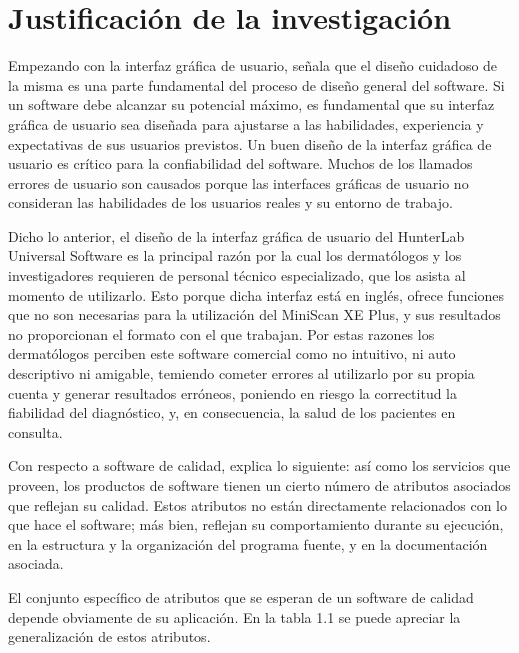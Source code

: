 	\section{Justificaci\'{o}n de la investigaci\'{o}n}
	
	Empezando con la interfaz gr\'{a}fica de usuario, \cite{Sommerville} se\~{n}ala que el dise\~{n}o cuidadoso de la misma es una parte fundamental del proceso de dise\~{n}o general del software. Si un software debe alcanzar su potencial m\'{a}ximo, es fundamental que su interfaz gr\'{a}fica de usuario sea dise\~{n}ada para ajustarse a las habilidades, experiencia y expectativas de sus usuarios previstos. Un buen dise\~{n}o de la interfaz gr\'{a}fica de usuario es cr\'{i}tico para la confiabilidad del software. Muchos de los llamados errores de usuario son causados porque las interfaces gr\'{a}ficas de usuario no consideran las habilidades de los usuarios reales y su entorno de trabajo.

	Dicho lo anterior, el dise\~{n}o de la interfaz gr\'{a}fica de usuario del HunterLab Universal Software es la principal raz\'{o}n por la cual los dermat\'{o}logos y los investigadores requieren de personal t\'{e}cnico especializado, que los asista al momento de utilizarlo. Esto porque dicha interfaz est\'{a} en ingl\'{e}s, ofrece funciones que no son necesarias para la utilizaci\'{o}n del MiniScan XE Plus, y sus resultados no proporcionan el formato con el que trabajan. Por estas razones los dermat\'{o}logos perciben este software comercial como no intuitivo, ni auto descriptivo ni amigable, temiendo cometer errores al utilizarlo por su propia cuenta y generar resultados err\'{o}neos, poniendo en riesgo la correctitud la fiabilidad del diagn\'{o}stico, y, en consecuencia, la salud de los pacientes en consulta.

	Con respecto a software de calidad, \cite{Sommerville} explica lo siguiente: as\'{i} como los servicios que proveen, los productos de software tienen un cierto n\'{u}mero de atributos asociados que reflejan su calidad. Estos atributos no est\'{a}n directamente relacionados con lo que hace el software; m\'{a}s bien, reflejan su comportamiento durante su ejecuci\'{o}n, en la estructura y la organizaci\'{o}n del programa fuente, y en la documentaci\'{o}n asociada.

El conjunto espec\'{i}fico de atributos que se esperan de un software de calidad depende obviamente de su aplicaci\'{o}n. En la tabla 1.1 se puede apreciar la generalizaci\'{o}n de estos atributos.

